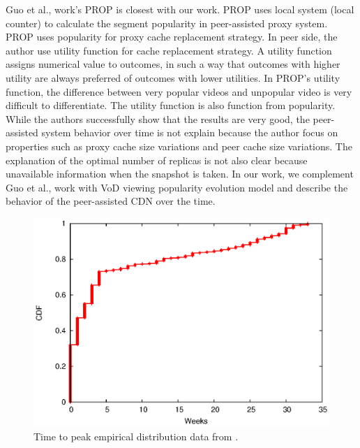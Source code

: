 \documentclass[10pt,final,journal,a4paper]{IEEEtran}
\begin{document}
Guo et al., \cite{1613869} work's PROP is closest with our work.
PROP uses local system (local counter) to calculate the segment popularity in peer-assisted proxy system. 
PROP uses popularity for proxy cache replacement strategy. 
In peer side, the author use utility function for cache replacement strategy.
A utility function assigns numerical value to outcomes, in such a way that outcomes with higher utility are always preferred of outcomes with lower utilities.
In PROP's utility function, the difference between very popular videos and unpopular video is very difficult to differentiate. 
The utility function is also function from popularity.
While the authors successfully show that the results are very good, the peer-assisted system behavior over time is not explain because the author focus on properties such as proxy cache size variations and peer cache size variations.
The explanation of the optimal number of replicas is not also clear because unavailable information when the snapshot is taken.  
In our work, we complement Guo et al., \cite{1613869} work with VoD viewing popularity evolution model and describe the behavior of the peer-assisted CDN over the time.

\begin{figure}[!t]
\begin{center}
\includegraphics[scale=0.6]{graphs/timetopeak.eps}
\end{center}
\caption{Time to peak empirical distribution data from \cite{Borghol:2011:CMP:2039452.2039717}.}
\label{fig:timetopeak}
\end{figure} 
\end{document}
